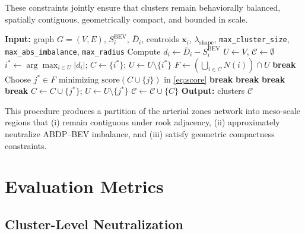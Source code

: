 \documentclass[conference]{IEEEtran}
\begin{document}
These constraints jointly ensure that clusters remain
behaviorally balanced, spatially contiguous, geometrically compact,
and bounded in scale.

\begin{algorithm}[t]
\caption{NBZC: Greedy Neutralization + Shape-Constrained Clustering}
\label{alg:nbzc}
\begin{algorithmic}[1]
\STATE \textbf{Input:} graph $G=(V,E)$, $S_i^{\mathrm{BEV}}$, $\bar{D}_i$,
centroids $\mathbf{x}_i$, $\lambda_{\mathrm{shape}}$,
\texttt{max\_cluster\_size}, \texttt{max\_abs\_imbalance}, \texttt{max\_radius}
\STATE Compute $d_i\leftarrow \bar{D}_i - S_i^{\mathrm{BEV}}$
\STATE $U \leftarrow V$, $\mathcal{C}\leftarrow \emptyset$
  \STATE $i^*\leftarrow \arg\max_{i\in U}|d_i|$; $C\leftarrow\{i^*\}$; $U\leftarrow U\setminus\{i^*\}$
    \STATE $F\leftarrow \left(\bigcup_{i\in C}N(i)\right)\cap U$
     \STATE \textbf{break} \ENDIF
    \STATE Choose $j^*\in F$ minimizing $\mathrm{score}(C\cup\{j\})$ in \eqref{eq:score}
     \STATE \textbf{break} \ENDIF
     \STATE \textbf{break} \ENDIF
     \STATE \textbf{break} \ENDIF
      \STATE \textbf{break}
    \ENDIF
    \STATE $C\leftarrow C\cup\{j^*\}$; $U\leftarrow U\setminus\{j^*\}$
  \ENDWHILE
  \STATE $\mathcal{C}\leftarrow \mathcal{C}\cup\{C\}$
\ENDWHILE
\STATE \textbf{Output:} clusters $\mathcal{C}$
\end{algorithmic}
\end{algorithm}

This procedure produces a partition of the arterial zones network into
meso-scale regions that (i) remain contiguous under rook adjacency,
(ii) approximately neutralize ABDP–BEV imbalance, and
(iii) satisfy geometric compactness constraints.
\section{Evaluation Metrics}

\subsection{Cluster-Level Neutralization}
\end{document}
